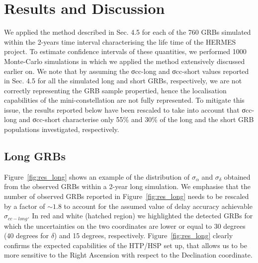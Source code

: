 \documentclass[]{spie}  %
\begin{document}
\section{Results and Discussion}

We applied the method described in Sec. 4.5 for each of the 760 GRBs simulated within the 2-years time interval characterising the life time of the HERMES project. To estimate confidence intervals of these quantities, we performed 1000 Monte-Carlo simulations in which we applied the method extensively discussed earlier on. We note that by assuming the σcc-long and σcc-short values reported in Sec. 4.5 for all the simulated long and short GRBs, respectively, we are not correctly representing the GRB sample propertied, hence the localisation capabilities of the mini-constellation are not fully represented. To mitigate this issue, the results reported below have been rescaled to take into account that σcc-long and σcc-short characterise only 55\% and 30\% of the long and the short GRB populations investigated, respectively.



\subsection{Long GRBs}

Figure~\ref{fig:res_long} shows an example of the distribution of $\sigma_\alpha$ and $\sigma_\delta$ obtained from the observed GRBs within a 2-year long simulation. We emphasise that the number of observed GRBs reported in Figure~\ref{fig:res_long} needs to be rescaled by a factor of $\sim1.8$ to account for the assumed value of delay accuracy achievable $\sigma_{cc-long}$. In red and white (hatched region) we highlighted the detected GRBs for which the uncertainties on the two coordinates are lower or equal to 30 degrees (40 degrees for $\delta$) and 15 degrees, respectively. Figure~\ref{fig:res_long} clearly confirms the expected capabilities of the HTP/HSP set up, that allows us to be more sensitive to the Right Ascension with respect to the Declination coordinate.  
\end{document}
